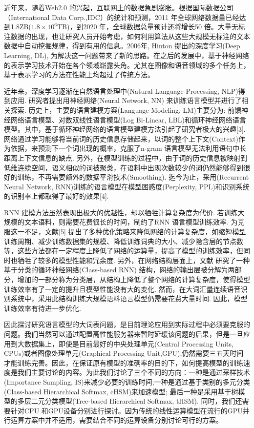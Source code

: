 \documentclass[12pt,a4paper]{article}
\begin{document}
近年来，随着Web2.0 的兴起，互联网上的数据急剧膨胀。根据国际数据公司（International Data Corp.,IDC）的统计和预测，2011 年全球网络数据量已经达到1.8ZB($1.8\times 10^6$TB)，到2020 年，全球数据总量预计还将增长50 倍。大量无标注数据的出现，也让研究人员开始考虑，如何利用算法从这些大规模无标注的文本数据中自动挖掘规律，得到有用的信息。2006年, Hinton 提出的深度学习(Deep Learning, DL)\cite{hinton2006reducing}, 为解决这一问题带来了新的思路。在之后的发展中，基于神经网络的表示学习技术开始在各个领域崭露头角。尤其在图像和语音领域的多个任务上，基于表示学习的方法在性能上均超过了传统方法。

近年来，深度学习逐渐在自然语言处理中(Natural Language Processing, NLP)得到应用. 研究者提出用神经网络(Neural Network, NN) 来训练语言模型并进行了相关探索\cite{DBLP:conf/nips/BengioDV00}. 历史上，主要的语言建模方案(Language Modeling, LM)主要分为: 前馈神经网络语言模型、对数双线性语言模型(Log Bi-Linear, LBL)和循环神经网络语言模型。其中，基于循环神经网络的语言模型建模方法引起了研究者极大的兴趣[3]. 网络通过学习能够将当前词的历史信息存储起来，以词的整个上下文(Context)作为依据，来预测下一个词出现的概率，克服了n-gram 语言模型无法利用语句中长距离上下文信息的缺点. 另外，在模型训练的过程中，由于词的历史信息被映射到低维连续空间，语义相似的词被聚类，在语料中出现次数较少的词仍然能够得到很好的训练，不再需要额外的数据平滑技术(Smoothing). 迄今为止，采用(Recurrent Neural Network, RNN)训练的语言模型在模型困惑度(Perplexity, PPL)和识别系统的识别率上都取得了最好的效果[4].

RNN 建模方法虽然表现出极大的优越性，却以牺牲计算复杂度为代价. 若训练大规模的文本语料，则需要花费很长的时间，制约了RNN 语言模型训练效率. 为克服这一不足，文献[5] 提出了多种优化策略来降低网络的计算复杂度，如缩短模型训练周期、减少训练数据集的规模、降低训练词典的大小、减少隐含层的节点数等，这些方法都在一定程度上降低了网络的运算量，提高了模型的训练效率，但同时也牺牲了较多的模型性能和冗余度. 另外，在网络结构层面上，文献\cite{DBLP:journals/coling/BrownPdLM92} 研究了一种基于分类的循环神经网络(Class-based RNN) 结构，网络的输出层被分解为两部分，增加的一部分称为分类层，从结构上降低了整个网络的计算复杂度，使得模型训练效率有了一定的提升且模型性能没有大的变化. 然而，在大词汇量连续语音识别系统中，采用此结构训练大规模语料语言模型仍需要花费大量时间. 因此，模型训练效率有待进一步优化.

因此探讨研究语言模型的大词表问题，是目前理论应用到实际过程中必须要克服的问题。我们当然可以通过配置高性能服务器来暂时延缓该问题的后果，但是一旦应用到大数据集上，即使是目前最好的中央处理单元(Central Processing Units, CPUs)或者图像处理单元(Graphical Processing Unit,GPU),仍然需要三五天时间才能训练完善。因此，在保证原有模型的准确率的目的下，如何提高模型的训练速度是我们主要讨论的内容。为此我们讨论了三个不同的方向：一种是通过采样技术(Importance Sampling, IS)来减少必要的训练时间;一种是通过基于类别的多元分类(Class-based Hierarchical Softmax, cHSM)来加速模型; 最后一种是采用基于树模型的多层二元分类模型(Tree-based Hierarchical Softmax, tHSM). 同时，我们还需要针对CPU 和GPU设备分别进行探讨。因为传统的线性运算模型在流行的GPU并行运算方案中并不适用，需要结合不同的运算设备分别讨论可行的方案。
\end{document}
